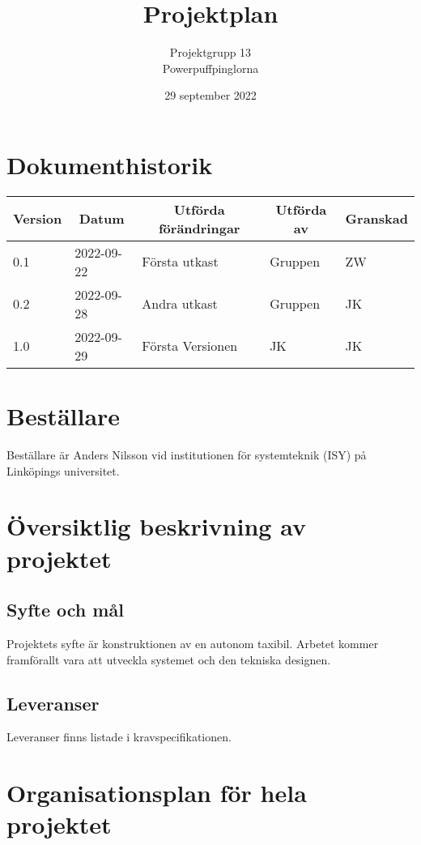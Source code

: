 \documentclass[10pt,oneside,swedish]{lips}
\title{Projektplan}
\author{Projektgrupp 13\\
        Powerpuffpinglorna}
\date{29 september 2022}
\begin{document}


\cleardoublepage
\tableofcontents

\cleardoublepage
\section*{Dokumenthistorik}
\begin{tabular}{p{}|p{}|p{}|p{}|p{}} 
  \multicolumn{1}{c}{\bfseries Version} & 
  \multicolumn{1}{|c}{\bfseries Datum} & 
  \multicolumn{1}{|c}{\bfseries Utförda förändringar} & 
  \multicolumn{1}{|c}{\bfseries Utförda av} & 
  \multicolumn{1}{|c}{\bfseries Granskad}\\
  \hline
  \hline
    0.1 & 2022-09-22 & Första utkast & Gruppen & ZW   \\
  \hline
    0.2 & 2022-09-28 & Andra utkast & Gruppen & JK   \\
  \hline
    1.0 & 2022-09-29 & Första Versionen & JK & JK   \\
  \hline
\end{tabular}

\cleardoublepage
{}\cfoot{\thepage}

\section{Beställare}
Beställare är Anders Nilsson vid institutionen för systemteknik (ISY) på Linköpings universitet.

\section{Översiktlig beskrivning av projektet}

\subsection{Syfte och mål}
Projektets syfte är konstruktionen av en autonom taxibil. Arbetet kommer framförallt vara att utveckla systemet och den tekniska designen.

\subsection{Leveranser}
Leveranser finns listade i kravspecifikationen\cite{kravspec}.


\section{Organisationsplan för hela projektet}
\end{document}
